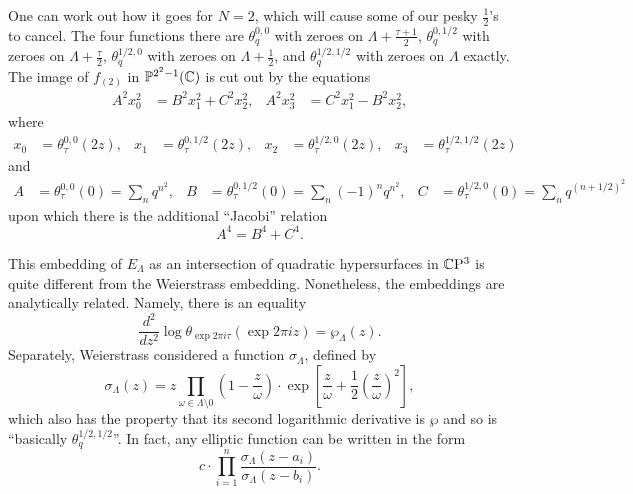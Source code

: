\begin{example}
One can work out how it goes for $N = 2$, which will cause some of our pesky $\frac{1}{2}$'s to cancel.  The four functions there are $\theta_q^{0,0}$ with zeroes on $\Lambda + \frac{\tau + 1}{2}$, $\theta_q^{0,1/2}$ with zeroes on $\Lambda + \frac{\tau}{2}$, $\theta_q^{1/2,0}$ with zeroes on $\Lambda + \frac{1}{2}$, and $\theta_q^{1/2,1/2}$ with zeroes on $\Lambda$ exactly.  The image of $f_{(2)}$ in $\mathbb{P}^{2^2 - 1}(\mathbb{C})$ is cut out by the equations
\begin{align*}
A^2 x_0^2 & = B^2 x_1^2 + C^2 x_2^2, &
A^2 x_3^2 & = C^2 x_1^2 - B^2 x_2^2,
\end{align*}
where
\begin{align*}
x_0 & = \theta_\tau^{0, 0}(2z), &
x_1 & = \theta_\tau^{0, 1/2}(2z), &
x_2 & = \theta_\tau^{1/2, 0}(2z), &
x_3 & = \theta_\tau^{1/2, 1/2}(2z)
\end{align*}
and
\begin{align*}
A & = \theta_\tau^{0, 0}(0) = \sum_n q^{n^2}, &
B & = \theta_\tau^{0, 1/2}(0) = \sum_n (-1)^n q^{n^2}, &
C & = \theta_\tau^{1/2, 0}(0) = \sum_n q^{(n + 1/2)^2}
\end{align*}
upon which there is the additional ``Jacobi'' relation \[A^4 = B^4 + C^4.\]
\end{example}

\begin{remark}
This embedding of $E_\Lambda$ as an intersection of quadratic hypersurfaces in $\mathbb{C}\mathrm P^3$ is quite different from the Weierstrass embedding.  Nonetheless, the embeddings are analytically related.  Namely, there is an equality \[\frac{d^2}{dz^2} \log \theta_{\exp{2 \pi i \tau}}(\exp{2 \pi i z}) = \wp_\Lambda(z).\]  Separately, Weierstrass considered a function $\sigma_\Lambda$, defined by \[\sigma_\Lambda(z) = z \prod_{\omega \in \Lambda \setminus 0} \left( 1 - \frac{z}{\omega} \right) \cdot \exp \left[ \frac{z}{\omega} + \frac{1}{2} \left( \frac{z}{\omega} \right)^2 \right],\] which also has the property that its second logarithmic derivative is $\wp$ and so is ``basically $\theta_q^{1/2,1/2}$''.  In fact, any elliptic function can be written in the form \[c \cdot \prod_{i=1}^n \frac{\sigma_\Lambda(z - a_i)}{\sigma_\Lambda(z - b_i)}.\]
\end{remark}

